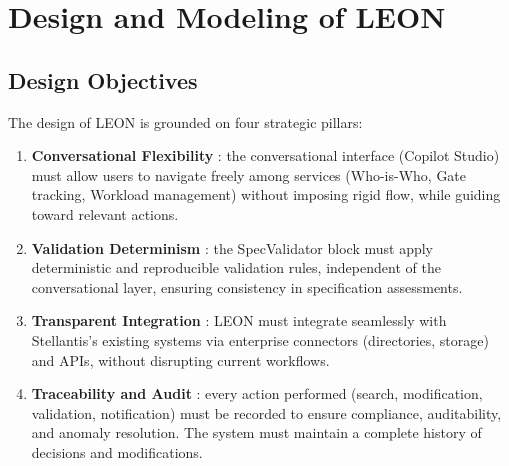 
\chapter{Design and Modeling of LEON}
\label{chap:design}

\section{\textcolor[HTML]{0066CC}{Design Objectives}}
\label{sec:design-objectives}

The design of LEON is grounded on four strategic pillars:

\begin{enumerate}
    \item \textcolor[HTML]{003D99}{\textbf{Conversational Flexibility}} : the conversational interface (Copilot Studio) must allow users to navigate freely among services (Who-is-Who, Gate tracking, Workload management) without imposing rigid flow, while guiding toward relevant actions.
    
    \item \textcolor[HTML]{003D99}{\textbf{Validation Determinism}} : the SpecValidator block must apply deterministic and reproducible validation rules, independent of the conversational layer, ensuring consistency in specification assessments.
    
    \item \textcolor[HTML]{003D99}{\textbf{Transparent Integration}} : LEON must integrate seamlessly with Stellantis's existing systems via enterprise connectors (directories, storage) and APIs, without disrupting current workflows.
    
    \item \textcolor[HTML]{003D99}{\textbf{Traceability and Audit}} : every action performed (search, modification, validation, notification) must be recorded to ensure compliance, auditability, and anomaly resolution. The system must maintain a complete history of decisions and modifications.
\end{enumerate}

